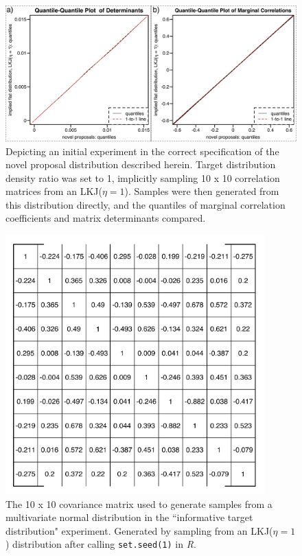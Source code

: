 \documentclass[10pt]{article}
\begin{document}
\begin{figure}[h]
\centering
\includegraphics[width=145mm]{figures/app_lkj1_samples.pdf}
\caption[Sampling from the Prior with a Novel Proposal Distribution]{Depicting an initial experiment in the correct specification of the novel proposal distribution described herein. Target distribution density ratio was set to 1, implicitly sampling 10 x 10 correlation matrices from an LKJ($\eta = 1$). Samples were then generated from this distribution directly, and the quantiles of marginal correlation coefficients and matrix determinants compared. \label{overflow}
\label{fig:priorSamplingResults}}
\end{figure}

\begin{figure}[h]
\centering
\includegraphics[width=100mm]{figures/appendix_correlationmatrix.pdf}
\caption[10 x 10 Correlation Matrix Used in Simulation Experiment]{The 10 x 10 covariance matrix used to generate samples from a multivariate normal distribution in the ``informative target distribution" experiment. Generated by sampling from an LKJ($\eta = 1$) distribution after calling \texttt{set.seed(1)} in \textit{R}. \label{fig:sample10x10CorrMatrix}
\label{overflow}}
\end{figure}
\end{document}
